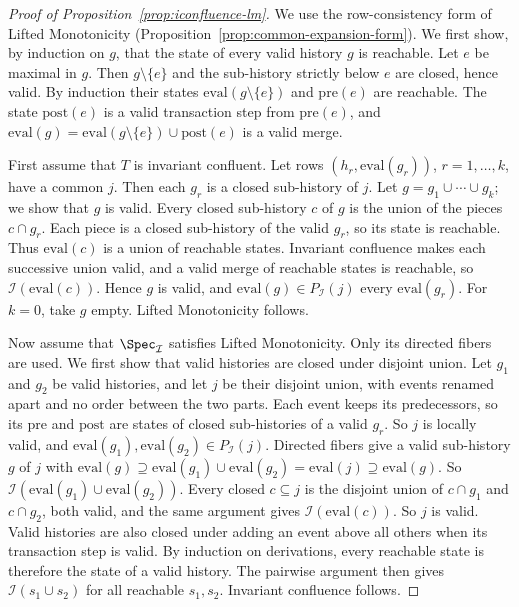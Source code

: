 \begin{proof}[Proof of Proposition~\ref{prop:iconfluence-lm}]
We use the row-consistency form of Lifted Monotonicity
(Proposition~\ref{prop:common-expansion-form}).  We first show, by induction
on $g$, that the state of every valid history $g$ is reachable.  Let $e$ be
maximal in $g$.  Then $g\setminus\{e\}$ and the sub-history strictly below $e$
are closed, hence valid.  By induction their states
$\mathrm{eval}(g\setminus\{e\})$ and $\mathrm{pre}(e)$ are reachable.  The
state $\mathrm{post}(e)$ is a valid transaction step from $\mathrm{pre}(e)$,
and $\mathrm{eval}(g)=\mathrm{eval}(g\setminus\{e\})\cup\mathrm{post}(e)$ is a
valid merge.

First assume that $T$ is invariant confluent.  Let rows
$(h_r,\mathrm{eval}(g_r))$, $r=1,\ldots,k$, have a common \indesc $j$.  Then each $g_r$ is a closed sub-history of $j$.  Let
$g=g_1\cup\cdots\cup g_k$; we show that $g$ is valid.  Every closed
sub-history $c$ of $g$ is the union of the pieces $c\cap g_r$.  Each piece is
a closed sub-history of the valid $g_r$, so its state is reachable.  Thus
$\mathrm{eval}(c)$ is a union of reachable states.
Invariant confluence makes each successive union valid, and a valid merge of
reachable states is reachable, so $\mathcal I(\mathrm{eval}(c))$.  Hence $g$
is valid, and $\mathrm{eval}(g)\in P_{\mathcal I}(j)$ \outrel every
$\mathrm{eval}(g_r)$.  For $k=0$, take $g$ empty.  Lifted Monotonicity
follows.

Now assume that $\Spec_{\mathcal I}$ satisfies Lifted Monotonicity.  Only its
directed fibers are used.  We first show that valid histories are closed under
disjoint union.  Let $g_1$ and $g_2$ be valid histories, and let $j$ be their
disjoint union, with events renamed apart and no order between the two
parts.  Each event keeps its
predecessors, so its $\mathrm{pre}$ and $\mathrm{post}$ are states of closed
sub-histories of a valid $g_r$.  So $j$ is locally valid, and
$\mathrm{eval}(g_1),\mathrm{eval}(g_2)\in P_{\mathcal I}(j)$.  Directed
fibers give a valid sub-history $g$ of $j$ with
$\mathrm{eval}(g)\supseteq\mathrm{eval}(g_1)\cup\mathrm{eval}(g_2)=\mathrm{eval}(j)\supseteq\mathrm{eval}(g)$.
So $\mathcal I(\mathrm{eval}(g_1)\cup\mathrm{eval}(g_2))$.  Every closed
$c\subseteq j$ is the disjoint union of $c\cap g_1$ and $c\cap g_2$, both
valid, and the same argument gives $\mathcal I(\mathrm{eval}(c))$.  So $j$ is
valid.  Valid histories are also closed under adding an event above all
others when its transaction step is valid.  By induction on derivations, every
reachable state is therefore the state of a valid history.  The pairwise
argument then gives $\mathcal I(s_1\cup s_2)$ for all reachable $s_1,s_2$.
Invariant confluence follows.
\end{proof}

